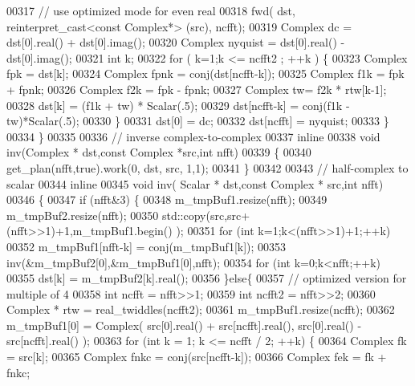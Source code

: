 \begin{DoxyCode}
00317         \textcolor{comment}{// use optimized mode for even real}
00318         fwd( dst, reinterpret\_cast<const Complex*> (src), ncfft);
00319         Complex dc = dst[0].real() +  dst[0].imag();
00320         Complex nyquist = dst[0].real() -  dst[0].imag();
00321         \textcolor{keywordtype}{int} k;
00322         \textcolor{keywordflow}{for} ( k=1;k <= ncfft2 ; ++k ) \{
00323           Complex fpk = dst[k];
00324           Complex fpnk = conj(dst[ncfft-k]);
00325           Complex f1k = fpk + fpnk;
00326           Complex f2k = fpk - fpnk;
00327           Complex tw= f2k * rtw[k-1];
00328           dst[k] =  (f1k + tw) * Scalar(.5);
00329           dst[ncfft-k] =  conj(f1k -tw)*Scalar(.5);
00330         \}
00331         dst[0] = dc;
00332         dst[ncfft] = nyquist;
00333       \}
00334     \}
00335 
00336   \textcolor{comment}{// inverse complex-to-complex}
00337   \textcolor{keyword}{inline}
00338     \textcolor{keywordtype}{void} inv(Complex * dst,\textcolor{keyword}{const} Complex  *src,\textcolor{keywordtype}{int} nfft)
00339     \{
00340       get\_plan(nfft,\textcolor{keyword}{true}).work(0, dst, src, 1,1);
00341     \}
00342 
00343   \textcolor{comment}{// half-complex to scalar}
00344   \textcolor{keyword}{inline}
00345     \textcolor{keywordtype}{void} inv( Scalar * dst,\textcolor{keyword}{const} Complex * src,\textcolor{keywordtype}{int} nfft) 
00346     \{
00347       \textcolor{keywordflow}{if} (nfft&3) \{
00348         m\_tmpBuf1.resize(nfft);
00349         m\_tmpBuf2.resize(nfft);
00350         std::copy(src,src+(nfft>>1)+1,m\_tmpBuf1.begin() );
00351         \textcolor{keywordflow}{for} (\textcolor{keywordtype}{int} k=1;k<(nfft>>1)+1;++k)
00352           m\_tmpBuf1[nfft-k] = conj(m\_tmpBuf1[k]);
00353         inv(&m\_tmpBuf2[0],&m\_tmpBuf1[0],nfft);
00354         \textcolor{keywordflow}{for} (\textcolor{keywordtype}{int} k=0;k<nfft;++k)
00355           dst[k] = m\_tmpBuf2[k].real();
00356       \}\textcolor{keywordflow}{else}\{
00357         \textcolor{comment}{// optimized version for multiple of 4}
00358         \textcolor{keywordtype}{int} ncfft = nfft>>1;
00359         \textcolor{keywordtype}{int} ncfft2 = nfft>>2;
00360         Complex * rtw = real\_twiddles(ncfft2);
00361         m\_tmpBuf1.resize(ncfft);
00362         m\_tmpBuf1[0] = Complex( src[0].real() + src[ncfft].real(), src[0].real() - src[ncfft].real() );
00363         \textcolor{keywordflow}{for} (\textcolor{keywordtype}{int} k = 1; k <= ncfft / 2; ++k) \{
00364           Complex fk = src[k];
00365           Complex fnkc = conj(src[ncfft-k]);
00366           Complex fek = fk + fnkc;

\end{DoxyCode}
